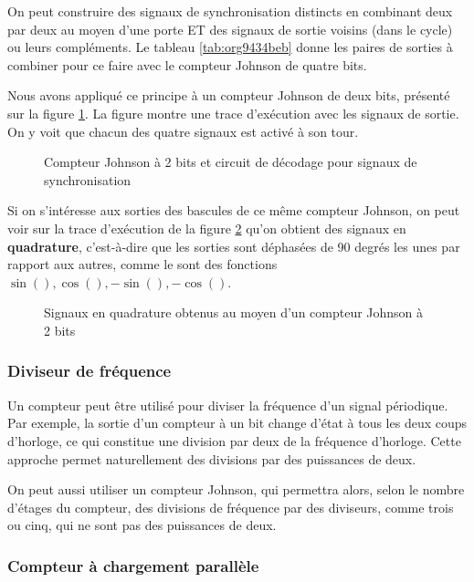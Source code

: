 \documentclass[11pt]{article}
\begin{document}
On peut construire des signaux de synchronisation distincts en
combinant deux par deux au moyen d'une porte ET des signaux de sortie
voisins (dans le cycle) ou leurs compléments. Le tableau \ref{tab:org9434beb}
donne les paires de sorties à combiner pour ce faire avec le compteur
Johnson de quatre bits.

Nous avons appliqué ce principe à un compteur Johnson de deux bits,
présenté sur la figure \ref{fig:org6296b48}. La figure montre une trace
d'exécution avec les signaux de sortie. On y voit que chacun des
quatre signaux est activé à son tour.

\begin{figure}[htbp]
\centering

\caption{\label{fig:org6296b48}Compteur Johnson à 2 bits et circuit de décodage pour signaux de synchronisation}
\end{figure}

Si on s'intéresse aux sorties des bascules de ce même compteur
Johnson, on peut voir sur la trace d'exécution de la figure
\ref{fig:org95bcf84} qu'on obtient des signaux en \textbf{quadrature},
c'est-à-dire que les sorties sont déphasées de 90 degrés les unes par
rapport aux autres, comme le sont des fonctions \(\sin(), \cos(),
-\sin(), -\cos()\).

\begin{figure}[htbp]
\centering

\caption{\label{fig:org95bcf84}Signaux en quadrature obtenus au moyen d'un compteur Johnson à 2 bits}
\end{figure} 

\subsubsection{Diviseur de fréquence}
\label{sec:org86018ac}

Un compteur peut être utilisé pour diviser la fréquence d'un signal
périodique. Par exemple, la sortie d'un compteur à un bit change
d'état à tous les deux coups d'horloge, ce qui constitue une division
par deux de la fréquence d'horloge. Cette approche permet
naturellement des divisions par des puissances de deux.

On peut aussi utiliser un compteur Johnson, qui permettra alors, selon
le nombre d'étages du compteur, des divisions de fréquence par des
diviseurs, comme trois ou cinq, qui ne sont pas des puissances de deux.

\subsubsection{Compteur à chargement parallèle}
\label{sec:org180aa4a}
\end{document}
